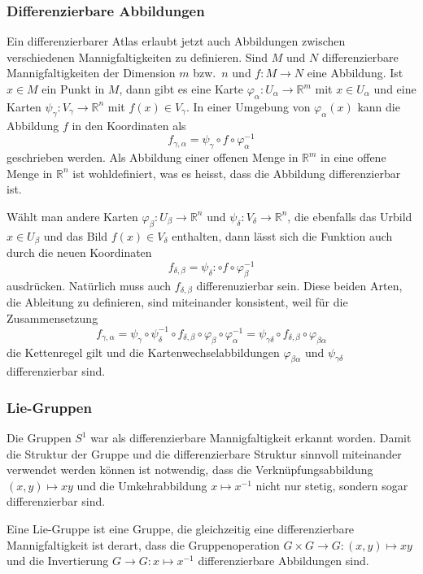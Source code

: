 %
%
\subsubsection{Differenzierbare Abbildungen}
Ein differenzierbarer Atlas erlaubt jetzt auch Abbildungen zwischen
verschiedenen Mannigfaltigkeiten zu definieren.
Sind $M$ und $N$ differenzierbare Mannigfaltigkeiten der Dimension $m$
bzw.~$n$ und $f\colon M\to N$ eine Abbildung.
Ist $x\in M$ ein Punkt in $M$, dann gibt es eine Karte
$\varphi_\alpha\colon U_\alpha\to\mathbb{R}^m$ mit $x\in U_\alpha$
und eine Karten $\psi_\gamma\colon V_\gamma\to\mathbb{R}^n$ mit
$f(x)\in V_\gamma$.
In einer Umgebung von $\varphi_\alpha(x)$ kann die Abbildung $f$
in den Koordinaten als
\[
f_{\gamma,\alpha}
=
\psi_\gamma\circ f \circ \varphi_\alpha^{-1}
\]
geschrieben werden.
Als Abbildung einer offenen Menge in $\mathbb{R}^m$ in eine offene
Menge in $\mathbb{R}^n$ ist wohldefiniert, was es heisst, dass die
Abbildung differenzierbar ist.

Wählt man andere Karten $\varphi_\beta\colon U_\beta\to\mathbb{R}^n$
und $\psi_\delta\colon V_\delta\to\mathbb{R}^n$, die ebenfalls
das Urbild $x\in U_\beta$ und das Bild $f(x)\in V_\delta$ enthalten,
dann lässt sich die Funktion auch durch die neuen Koordinaten
\[
f_{\delta,\beta}
=
\psi_\delta\colon \circ f \circ\varphi_\beta^{-1}
\]
ausdrücken.
Natürlich muss auch $f_{\delta,\beta}$ differenuzierbar sein.
Diese beiden Arten, die Ableitung zu definieren, sind miteinander
konsistent, weil für die Zusammensetzung
\[
f_{\gamma,\alpha}
=
\psi_\gamma\circ\psi_\delta^{-1}
\circ
f_{\delta,\beta}
\circ
\varphi_\beta\circ\varphi_\alpha^{-1}
=
\psi_{\gamma\delta}
\circ
f_{\delta,\beta}
\circ
\varphi_{\beta\alpha}
\]
die Kettenregel gilt und die Kartenwechselabbildungen $\varphi_{\beta\alpha}$
und $\psi_{\gamma\delta}$ differenzierbar sind.

%
%
\subsubsection{Lie-Gruppen}
Die Gruppen $S^1$ war als differenzierbare Mannigfaltigkeit erkannt
worden.
Damit die Struktur der Gruppe und die differenzierbare Struktur sinnvoll
miteinander verwendet werden können ist notwendig, dass die
Verknüpfungsabbildung $(x,y)\mapsto xy$ und die Umkehrabbildung
$x\mapsto x^{-1}$ nicht nur stetig, sondern sogar differenzierbar sind.

\begin{definition}
\label{buch:gruppen:gruppe:def:liegruppe}
Eine Lie-Gruppe ist eine Gruppe, die gleichzeitig eine differenzierbare
Mannigfaltigkeit ist derart, dass die Gruppenoperation
$G\times G\to G:(x,y)\mapsto xy$
und die Invertierung $G\to G: x\mapsto x^{-1}$ differenzierbare Abbildungen
sind.
\end{definition}

